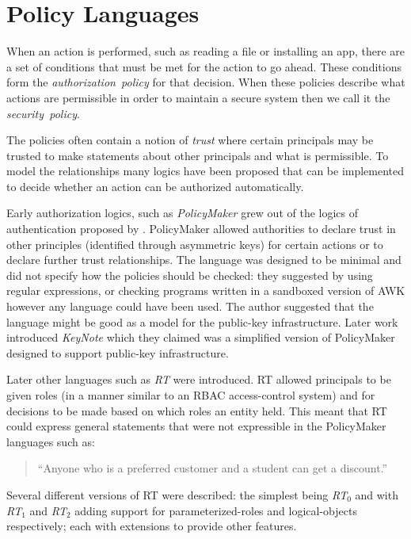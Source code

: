 \documentclass[report.tex]{subfiles}
\begin{document}

\section{Policy Languages}

When an action is performed, such as reading a file or installing an app, there
are a set of conditions that must be met for the action to go ahead.  These
conditions form the \emph{authorization~policy} for that decision.  When these
policies describe what actions are permissible in order to maintain a secure
system then we call it the \emph{security~policy}.  

The policies often contain a notion of \emph{trust} where certain principals
may be trusted to make statements about other principals and what is
permissible.  To model the relationships many logics have been proposed that can
be implemented to decide whether an action can be authorized automatically.

Early authorization logics, such as \emph{PolicyMaker}\cite{Blaze:dj} grew out
of the logics of authentication proposed by
\citeauthor*{Wobber:1994dh}\cite{Lampson:1992jg}\cite{Wobber:1994dh}.
PolicyMaker allowed authorities to declare trust in other principles (identified
through asymmetric keys) for certain actions or to declare further trust
relationships.  The language was designed to be minimal and did not specify how
the policies should be checked: they suggested by using regular expressions, or
checking programs written in a sandboxed version of AWK however any language
could have been used. The author suggested that the language might be good as a
model for the public-key infrastructure.  Later work introduced
\emph{KeyNote}\cite{Blaze:1999fa} which they claimed was a simplified version of
PolicyMaker designed to support public-key infrastructure.

Later other languages such as \emph{RT}\cite{Li:2002if} were introduced.  RT
allowed principals to be given roles (in a manner similar to an \ac{RBAC}
access-control system) and for decisions to be made based on which roles an
entity held.  This meant that RT could express general statements that were not
expressible in the PolicyMaker languages such as:
\begin{quote}
  ``Anyone who is a preferred customer and a student can get a discount.''
\end{quote}
Several different versions of RT were described: the simplest being
\emph{RT$_0$}\cite{Li:2003tj} and with \emph{RT$_1$} and \emph{RT$_2$} adding support for
parameterized-roles and logical-objects respectively; each with extensions to
provide other features.
\end{document}
